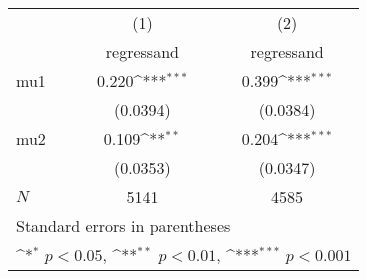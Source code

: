 {
\def\sym#1{\ifmmode^{#1}\else\(^{#1}\)\fi}
\begin{tabular}{l*{2}{c}}
\toprule
            &\multicolumn{1}{c}{(1)}&\multicolumn{1}{c}{(2)}\\
            &\multicolumn{1}{c}{regressand}&\multicolumn{1}{c}{regressand}\\
\midrule
mu1         &       0.220\sym{***}&       0.399\sym{***}\\
            &    (0.0394)         &    (0.0384)         \\
\addlinespace
mu2         &       0.109\sym{**} &       0.204\sym{***}\\
            &    (0.0353)         &    (0.0347)         \\
\midrule
\(N\)       &        5141         &        4585         \\
\bottomrule
\multicolumn{3}{l}{\footnotesize Standard errors in parentheses}\\
\multicolumn{3}{l}{\footnotesize \sym{*} \(p<0.05\), \sym{**} \(p<0.01\), \sym{***} \(p<0.001\)}\\
\end{tabular}
}
